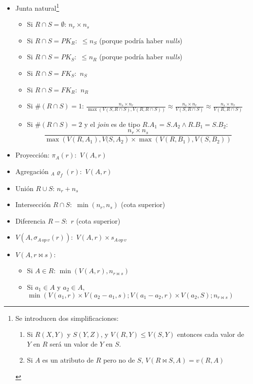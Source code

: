 \documentclass[a4paper, twoside]{article}
\begin{document}
\begin{itemize}
	\item Junta natural\footnote{Se introducen dos simplificaciones:
		\begin{enumerate}
			\item Si $R(X,Y)$ y $S(Y,Z)$, y $V(R,Y)\leq V(S,Y)$ entonces cada valor de $Y$ en $R$ será un valor de $Y$ en $S$.
			\item Si $A$ es un atributo de $R$ pero no de $S$, $V\left(R\bowtie S,A\right)=v\left(R,A\right)$
		\end{enumerate}}
	\begin{itemize}
		\item Si $R\cap S=\emptyset$: $n_{r}\times n_{s}$
		\item Si $R\cap S=PK_{R}:$ $\leq n_{S}$ (porque podría haber \emph{nulls})
		\item Si $R\cap S=PK_{S}:$ $\leq n_{R}$ (porque podría haber \emph{nulls})
		\item Si $R\cap S=FK_{S}:$ $n_{S}$
		\item Si $R\cap S=FK_{R}:$ $n_{R}$
		\item Si $\#(R\cap S)=1$: $\frac{n_{s}\times n_{r}}{\max\left(V(S,R\cap S),V(R,R\cap S)\right)}\approx\frac{n_{s}\times n_{r}}{V(S,R\cap S)}\approx\frac{n_{s}\times n_{r}}{V(R,R\cap S)}$
		\item Si $\#(R\cap S)=2$ y el \emph{join} es de tipo $R.A_{1}=S.A_{2}\wedge R.B_{1}=S.B_{2}$:
		\[
			\frac{n_{r} \times n_{s}}{\max \left( V(R,A_{1}), V(S,A_{2} \right) \times \max \left( V(R,B_{1}), V(S,B_{2}) \right)}
		\]
	\end{itemize}

	\item Proyección: $\pi_{A}(r):$ $V(A,r)$
	\item Agregación $_{A}\varrho_{f}(r):$ $V(A,r)$
	\item Unión $R\cup S$: $n_{r}+n_{s}$
	\item Intersección $R\cap S:$ $\min\left(n_{r},n_{s}\right)$ (cota superior)
	\item Diferencia $R-S:$ $r$ (cota superior)
	\item $V\left(A,\sigma_{A\, op\, v}(r)\right):$ $V(A,r)\times s_{A\, op\, v}$
	\item $V\left(A,r\bowtie s\right):$ 
	\begin{itemize}
		\item Si $A\in R$: $\min\left(V(A,r),n_{r\bowtie s}\right)$
		\item Si $a_{1}\in A$ y $a_{2}\in A$, $\min\left(V(a_{1},r)\times V(a_{2}-a_{1},s);V(a_{1}-a_{2},r)\times V(a_{2},S);n_{r\bowtie s}\right)$
	\end{itemize}
\end{itemize}
\end{document}
